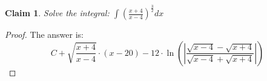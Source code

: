 \documentclass{article}
\newtheorem{theorem}{Claim}
\begin{document}
\begin{theorem}
Solve the integral:
$
\int \left(\frac{ x+4 }{ x-4 } \right)^{\frac{ 3 }{ 2 }}   dx
$
\end{theorem}

\begin{proof}
The answer is:
\[
C+\sqrt{\frac{x+4}{x-4}}\cdot(x-20)-12\cdot\ln\left(\left|\frac{\sqrt{x-4}-\sqrt{x+4}}{\sqrt{x-4}+\sqrt{x+4}}\right|\right)
\]
\end{proof}
\end{document}
